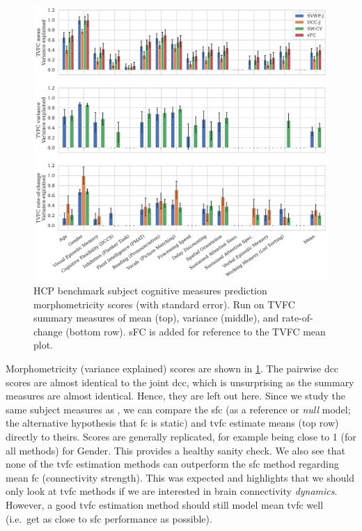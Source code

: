 \begin{figure}[t]
  \centering
  \includegraphics[width=\textwidth]{fig/hcp/d15/subject_measure_prediction/cognitive/morphometricity_all_TVFC_summary_measures}
  \caption{
    HCP benchmark subject cognitive measures prediction morphometricity scores (with standard error).
    Run on TVFC summary measures of mean (top), variance (middle), and rate-of-change (bottom row).
    sFC is added for reference to the TVFC mean plot.
  }\label{fig:hcp-results-subject-measures-prediction}
\end{figure}


Morphometricity (variance explained) scores are shown in \cref{fig:hcp-results-subject-measures-prediction}.
The pairwise \gls{dcc} scores are almost identical to the joint \gls{dcc}, which is unsurprising as the summary measures are almost identical.
Hence, they are left out here.
%
Since we study the same subject measures as \textcite{Li2019a}, we can compare the \gls{sfc} (as a reference or \emph{null} model; the alternative hypothesis that \gls{fc} is static) and \gls{tvfc} estimate means (top row) directly to theirs.
Scores are generally replicated, for example being close to 1 (for all methods) for Gender.
This provides a healthy sanity check.
%
We also see that none of the \gls{tvfc} estimation methods can outperform the \gls{sfc} method regarding mean \gls{fc} (connectivity strength).
This was expected and highlights that we should only look at \gls{tvfc} methods if we are interested in brain connectivity \emph{dynamics}.
However, a good \gls{tvfc} estimation method should still model mean \gls{tvfc} well (i.e.~get as close to \gls{sfc} performance as possible).

